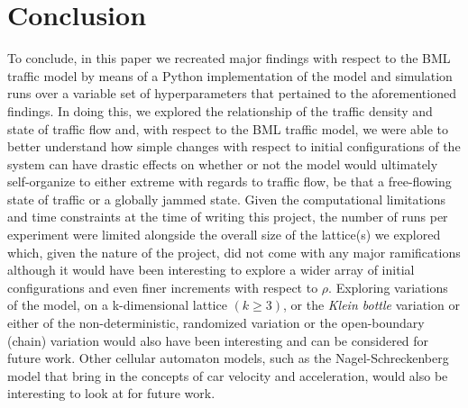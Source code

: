 \section{Conclusion}
\label{sec:Conclusion}
To conclude, in this paper we recreated major findings with respect to the BML traffic model by means of a Python implementation of the model and simulation runs over a variable set of hyperparameters that pertained to the aforementioned findings. In doing this, we explored the relationship of the traffic density and state of traffic flow and, with respect to the BML traffic model, we were able to better understand how simple changes with respect to initial configurations of the system can have drastic effects on whether or not the model would ultimately self-organize to either extreme with regards to traffic flow, be that a free-flowing state of traffic or a globally jammed state. Given the computational limitations and time constraints at the time of writing this project, the number of runs per experiment were limited alongside the overall size of the lattice(s) we explored which, given the nature of the project, did not come with any major ramifications although it would have been interesting to explore a wider array of initial configurations and even finer increments with respect to $\rho$. Exploring variations of the model,  \ie on a k-dimensional lattice $(k \geq 3)$, or the \textit{Klein bottle} variation or either of the non-deterministic, randomized variation or the open-boundary (chain) variation would also have been interesting and can be considered for future work. Other cellular automaton models, such as the Nagel-Schreckenberg model that bring in the concepts of car velocity and acceleration, would also be interesting to look at for future work.